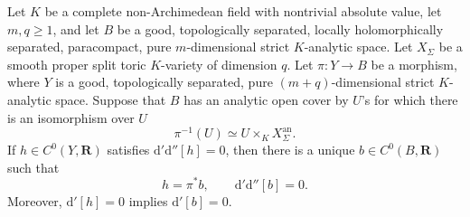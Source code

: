 \begin{proposition}
\label{prop:p062-smooth-proper-split-toric-bundle-descent}
Let $K$ be a complete non-Archimedean field with nontrivial absolute
value, let $m,q\geq1$, and let $B$ be a good, topologically separated,
locally holomorphically separated, paracompact, pure $m$-dimensional strict
$K$-analytic space.  Let $X_\Sigma$ be a smooth proper split toric
$K$-variety of dimension $q$.  Let $\pi:Y\to B$ be a morphism, where
$Y$ is a good, topologically separated, pure $(m+q)$-dimensional strict
$K$-analytic space.  Suppose that $B$ has an analytic open cover by
$U$'s for which there is an isomorphism over $U$
\[
                  \pi^{-1}(U)\simeq U\times_KX_\Sigma^{\mathrm{an}}.
\]
If $h\in C^0(Y,\mathbf R)$ satisfies
$\mathrm d'\mathrm d''[h]=0$, then there is a unique
$b\in C^0(B,\mathbf R)$ such that
\[
                         h=\pi^*b,
                         \qquad
                         \mathrm d'\mathrm d''[b]=0.
\]
Moreover, $\mathrm d'[h]=0$ implies $\mathrm d'[b]=0$.
\end{proposition}
